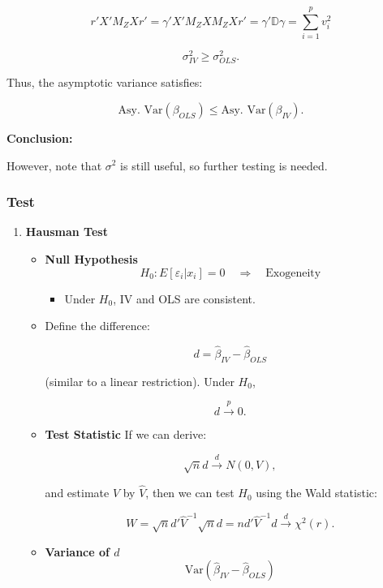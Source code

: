 \documentclass[12pt, oneside]{article}
\begin{document}
\[
r' X' M_Z X r' = \gamma' X' M_Z X M_Z X r' = \gamma' \mathbb{D} \gamma = \sum_{i=1}^{p} v_i^2
\]

\[
\sigma_{IV}^2 \geq \sigma_{OLS}^2.
\]

Thus, the asymptotic variance satisfies:

\[
\text{Asy. Var} (\beta_{OLS}) \leq \text{Asy. Var} (\beta_{IV}).
\]

\textbf*{Conclusion:}

However, note that \( \sigma^2 \) is still useful, so further testing is needed.

\subsubsection{Test}
\begin{enumerate}
    \item \textbf{Hausman Test}
    \begin{itemize}
        \item \textbf{Null Hypothesis}
            \[
            H_0: E[\varepsilon_i | x_i] = 0 \quad \Rightarrow \quad \text{Exogeneity}
            \]

            \begin{itemize}
                \item Under \( H_0 \), IV and OLS are consistent.
            \end{itemize}

        \item Define the difference:

            \[
            d = \hat{\beta}_{IV} - \hat{\beta}_{OLS}
            \]

            (similar to a linear restriction). Under \( H_0 \), 

            \[
            d \xrightarrow{p} 0.
            \]

        \item \textbf{Test Statistic}
            If we can derive:

            \[
            \sqrt{n} d \xrightarrow{d} N(0, V),
            \]

            and estimate \( V \) by \( \hat{V} \), then we can test \( H_0 \) using the Wald statistic:

            \[
            W = \sqrt{n} d' \hat{V}^{-1} \sqrt{n} d = n d' \hat{V}^{-1} d \xrightarrow{d} \chi^2(r).
            \]

        \item \textbf{Variance of \( d \)}
            \[
            \text{Var}(\hat{\beta}_{IV} - \hat{\beta}_{OLS})
            \]


\end{itemize}
\end{enumerate}
\end{document}
